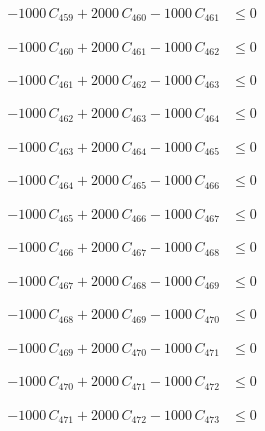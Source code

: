 \documentclass[a4paper,11pt]{article}
\begin{document}
\begin{align}
-1000\,C_{459} + 2000\,C_{460} - 1000\,C_{461} &\leq 0 \nonumber
\end{align}

\begin{align}
-1000\,C_{460} + 2000\,C_{461} - 1000\,C_{462} &\leq 0 \nonumber
\end{align}

\begin{align}
-1000\,C_{461} + 2000\,C_{462} - 1000\,C_{463} &\leq 0 \nonumber
\end{align}

\begin{align}
-1000\,C_{462} + 2000\,C_{463} - 1000\,C_{464} &\leq 0 \nonumber
\end{align}

\begin{align}
-1000\,C_{463} + 2000\,C_{464} - 1000\,C_{465} &\leq 0 \nonumber
\end{align}

\begin{align}
-1000\,C_{464} + 2000\,C_{465} - 1000\,C_{466} &\leq 0 \nonumber
\end{align}

\begin{align}
-1000\,C_{465} + 2000\,C_{466} - 1000\,C_{467} &\leq 0 \nonumber
\end{align}

\begin{align}
-1000\,C_{466} + 2000\,C_{467} - 1000\,C_{468} &\leq 0 \nonumber
\end{align}

\begin{align}
-1000\,C_{467} + 2000\,C_{468} - 1000\,C_{469} &\leq 0 \nonumber
\end{align}

\begin{align}
-1000\,C_{468} + 2000\,C_{469} - 1000\,C_{470} &\leq 0 \nonumber
\end{align}

\begin{align}
-1000\,C_{469} + 2000\,C_{470} - 1000\,C_{471} &\leq 0 \nonumber
\end{align}

\begin{align}
-1000\,C_{470} + 2000\,C_{471} - 1000\,C_{472} &\leq 0 \nonumber
\end{align}

\begin{align}
-1000\,C_{471} + 2000\,C_{472} - 1000\,C_{473} &\leq 0 \nonumber
\end{align}
\end{document}
